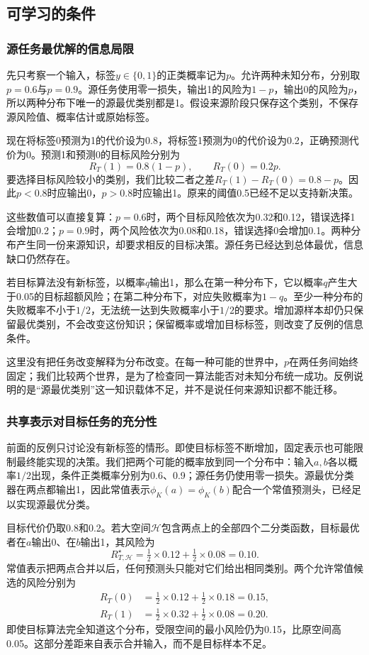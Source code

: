 \subsection{可学习的条件}

\subsubsection{源任务最优解的信息局限}

先只考察一个输入，标签$y\in\{0,1\}$的正类概率记为$p$。允许两种未知分布，分别取$p=0.6$与$p=0.9$。源任务使用零一损失，输出1的风险为$1-p$，输出0的风险为$p$，所以两种分布下唯一的源最优类别都是1。假设来源阶段只保存这个类别，不保存源风险值、概率估计或原始标签。

现在将标签0预测为1的代价设为0.8，将标签1预测为0的代价设为0.2，正确预测代价为0。预测1和预测0的目标风险分别为
\[
 R_T(1)=0.8(1-p),\qquad R_T(0)=0.2p.
\]
要选择目标风险较小的类别，我们比较二者之差$R_T(1)-R_T(0)=0.8-p$。因此$p<0.8$时应输出0，$p>0.8$时应输出1。原来的阈值0.5已经不足以支持新决策。

这些数值可以直接复算：$p=0.6$时，两个目标风险依次为0.32和0.12，错误选择1会增加0.2；$p=0.9$时，两个风险依次为0.08和0.18，错误选择0会增加0.1。两种分布产生同一份来源知识，却要求相反的目标决策。源任务已经达到总体最优，信息缺口仍然存在。

若目标算法没有新标签，以概率$q$输出1，那么在第一种分布下，它以概率$q$产生大于0.05的目标超额风险；在第二种分布下，对应失败概率为$1-q$。至少一种分布的失败概率不小于$1/2$，无法统一达到失败概率小于$1/2$的要求。增加源样本却仍只保留最优类别，不会改变这份知识；保留概率或增加目标标签，则改变了反例的信息条件。

这里没有把任务改变解释为分布改变。在每一种可能的世界中，$p$在两任务间始终固定；我们比较两个世界，是为了检查同一算法能否对未知分布统一成功。反例说明的是“源最优类别”这一知识载体不足，并不是说任何来源知识都不能迁移。

\subsubsection{共享表示对目标任务的充分性}

前面的反例只讨论没有新标签的情形。即使目标标签不断增加，固定表示也可能限制最终能实现的决策。我们把两个可能的概率放到同一个分布中：输入$a,b$各以概率$1/2$出现，条件正类概率分别为0.6、0.9；源任务仍使用零一损失。源最优分类器在两点都输出1，因此常值表示$\phi_K(a)=\phi_K(b)$配合一个常值预测头，已经足以实现源最优分类。

目标代价仍取0.8和0.2。若大空间$\mathcal H$包含两点上的全部四个二分类函数，目标最优者在$a$输出0、在$b$输出1，其风险为
\[
 R_{T,\mathcal H}^{\star}
 =\tfrac12\times0.12+\tfrac12\times0.08=0.10.
\]
常值表示把两点合并以后，任何预测头只能对它们给出相同类别。两个允许常值候选的风险分别为
\[
 \begin{aligned}
 R_T(0)&=\tfrac12\times0.12+\tfrac12\times0.18=0.15,\\
 R_T(1)&=\tfrac12\times0.32+\tfrac12\times0.08=0.20.
 \end{aligned}
\]
即使目标算法完全知道这个分布，受限空间的最小风险仍为0.15，比原空间高0.05。这部分差距来自表示合并输入，而不是目标样本不足。

